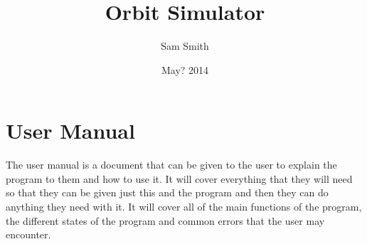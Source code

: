 \documentclass[a4paper,11pt,titlepage]{article}
\author{Sam Smith}
\title{Orbit Simulator}
\date{May? 2014}
\makeatletter
\newcommand\footype[1]{\def\@footype{#1}}
\let\Oldpart\part
\newcommand{\parttitle}{}
\renewcommand{\part}[1]{\Oldpart{#1}\renewcommand{\parttitle}{#1}}
\makeatother
\begin{document}
\maketitle
\footype{}
\tableofcontents
\clearpage
\footype{\bf Part \thepart: \parttitle}


\newcommand\add[1]{ \clearpage}

\add{analysis}
\add{design}
\add{testing}
\add{implementation}
\add{maintenance}
\part{User Manual}
The user manual is a document that can be given to the user to explain the
program to them and how to use it. It will cover everything that they will need
so that they can be given just this and the program and then they can do
anything they need with it. It will cover all of the main functions of the
program, the different states of the program and common errors that the user may
encounter.

\add{evaluation}
\end{document}
